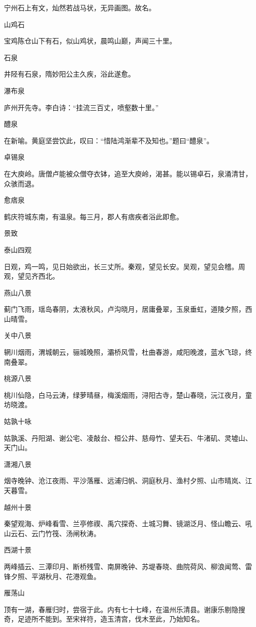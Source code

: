 \documentclass[a4paper,12pt,UTF8,twoside]{ctexbook}
\begin{document}
宁州石上有文，灿然若战马状，无异画图。故名。

山鸡石

宝鸡陈仓山下有石，似山鸡状，晨鸣山巅，声闻三十里。

石泉

井陉有石泉，隋妙阳公主久疾，浴此遂愈。

瀑布泉

庐州开先寺。李白诗：“挂流三百丈，喷壑数十里。”

醴泉

在新喻。黄庭坚尝饮此，叹曰：“惜陆鸿渐辈不及知也。”题曰“醴泉”。

卓锡泉

在大庾岭。唐僧卢能被众僧夺衣钵，追至大庾岭，渴甚。能以锡卓石，泉涌清甘，众骇而退。

愈痞泉

鹤庆符城东南，有温泉。每三月，郡人有痞疾者浴此即愈。

景致

泰山四观

日观，鸡一鸣，见日始欲出，长三丈所。秦观，望见长安。吴观，望见会稽。周观，望见齐西北。

燕山八景

蓟门飞雨，瑶岛春阴，太液秋风，卢沟晓月，居庸叠翠，玉泉垂虹，道陵夕照，西山晴雪。

关中八景

辋川烟雨，渭城朝云，骊城晚照，灞桥风雪，杜曲春游，咸阳晚渡，蓝水飞琼，终南叠翠。

桃源八景

桃川仙隐，白马云涛，绿萝晴昼，梅溪烟雨，浔阳古寺，楚山春晓，沅江夜月，童坊晓渡。

姑孰十咏

姑孰溪、丹阳湖、谢公宅、凌敲台、桓公井、慈母竹、望夫石、牛渚矶、灵墟山、天门山。

潇湘八景

烟寺晚钟、沧江夜雨、平沙落雁、远浦归帆、洞庭秋月、渔村夕照、山市晴岚、江天暮雪。

越州十景

秦望观海、炉峰看雪、兰亭修禊、禹穴探奇、土城习舞、镜湖泛月、怪山瞻云、吼山云石、云门竹筏、汤闸秋涛。

西湖十景

两峰插云、三潭印月、断桥残雪、南屏晚钟、苏堤春晓、曲院荷风、柳浪闻莺、雷锋夕照、平湖秋月、花港观鱼。

雁荡山

顶有一湖，春雁归时，尝宿于此。内有七十七峰，在温州乐清县。谢康乐剔隐搜奇，足迹所不能到。至宋祥符，造玉清宫，伐木至此，乃始知名。
\end{document}
